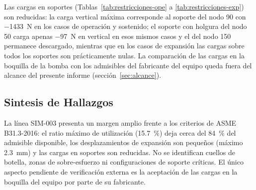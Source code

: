 Las cargas en soportes (Tablas~\ref{tab:restricciones-ope} a
\ref{tab:restricciones-exp}) son reducidas: la carga vertical m\'{a}xima
corresponde al soporte del nodo 90 con \num{-1433}~\si{N} en los casos de
operaci\'{o}n y sostenido; el soporte con holgura del nodo 50 carga apenas
\num{-97}~\si{N} en vertical en esos mismos casos y el del nodo 150 permanece
descargado, mientras que en los casos de expansi\'{o}n las cargas sobre todos
los soportes son pr\'{a}cticamente nulas. La comparaci\'{o}n de las
cargas en la boquilla de la bomba con los admisibles del fabricante del equipo
queda fuera del alcance del presente informe (secci\'{o}n~\ref{sec:alcance}).

\subsection{Sintesis de Hallazgos}

La l\'{i}nea SIM-003 presenta un margen amplio frente a los criterios de
ASME B31.3-2016: el ratio m\'{a}ximo de utilizaci\'{o}n (15.7~\%) deja cerca del
84~\% del admisible disponible, los desplazamientos de expansi\'{o}n son
peque\~{n}os (m\'{a}ximo 2.3~\si{mm}) y las cargas en soportes son reducidas.
No se identifican cuellos de botella, zonas de sobre-esfuerzo ni
configuraciones de soporte cr\'{i}ticas. El \'{u}nico aspecto pendiente de
verificaci\'{o}n externa es la aceptaci\'{o}n de las cargas en la boquilla del
equipo por parte de su fabricante.
